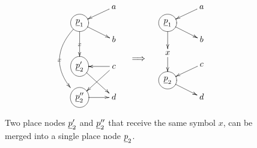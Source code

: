 \begin{figure}[h!]
$$
\begin{array}{ccc}
\xymatrix@R=.3pc{
& a\ar[dl]
\\
\Circle{\rvp_1}\ar[rd]
\ar[ddd]|x
\ar@/_2pc/[ddddd]|x
\\
& b
\\
\\
\Circle{\rvp_2'}\ar[rdd]
&c\ar[ldd]\ar[l]
\\
\\
\Circle{\rvp_2''}\ar[r]
&d
}&
\xymatrix
{
\\
\\
\implies}
&
\xymatrix@R=.3pc{
& a\ar[dl]
\\
\Circle{\rvp_1}\ar[rd]
\ar[dd]
\\
& b
\\
x\ar[dd]
\\
&c\ar[dl]
\\
\Circle{\rvp_2}\ar[rd]
\\
&d
}
\end{array}
$$
\caption{Two place nodes $\rvp_2'$ and $\rvp_2''$
that receive the same symbol $x$, can be
merged into a single place node $\rvp_2$.}
\label{fig-merge-two-x}
\end{figure}